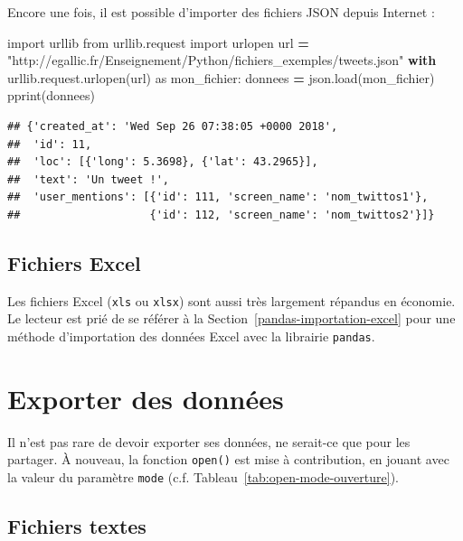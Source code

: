 \documentclass[
  12pt,
]{book}
\newenvironment{Shaded}{\begin{snugshade}}{\end{snugshade}}
\newcommand{\ControlFlowTok}[1]{\textcolor[rgb]{0.13,0.29,0.53}{\textbf{#1}}}
\newcommand{\ImportTok}[1]{#1}
\newcommand{\NormalTok}[1]{#1}
\newcommand{\OperatorTok}[1]{\textcolor[rgb]{0.81,0.36,0.00}{\textbf{#1}}}
\newcommand{\StringTok}[1]{\textcolor[rgb]{0.31,0.60,0.02}{#1}}
\numberwithin{equation}{section}
\numberwithin{countremarque}{section}
\begin{document}
Encore une fois, il est possible d'importer des fichiers JSON depuis Internet :

\begin{Shaded}
\begin{Highlighting}[]
\ImportTok{import}\NormalTok{ urllib}
\ImportTok{from}\NormalTok{ urllib.request }\ImportTok{import}\NormalTok{ urlopen}
\NormalTok{url }\OperatorTok{=} \StringTok{"http://egallic.fr/Enseignement/Python/fichiers\_exemples/tweets.json"}
\ControlFlowTok{with}\NormalTok{ urllib.request.urlopen(url) }\ImportTok{as}\NormalTok{ mon\_fichier:}
\NormalTok{   donnees }\OperatorTok{=}\NormalTok{ json.load(mon\_fichier)}
\NormalTok{pprint(donnees)}
\end{Highlighting}
\end{Shaded}

\begin{lstlisting}
## {'created_at': 'Wed Sep 26 07:38:05 +0000 2018',
##  'id': 11,
##  'loc': [{'long': 5.3698}, {'lat': 43.2965}],
##  'text': 'Un tweet !',
##  'user_mentions': [{'id': 111, 'screen_name': 'nom_twittos1'},
##                    {'id': 112, 'screen_name': 'nom_twittos2'}]}
\end{lstlisting}

\subsection{Fichiers Excel}\label{fichiers-excel}

Les fichiers Excel (\texttt{xls} ou \texttt{xlsx}) sont aussi très largement répandus en économie. Le lecteur est prié de se référer à la Section~\ref{pandas-importation-excel} pour une méthode d'importation des données Excel avec la librairie \texttt{pandas}.

\section{Exporter des données}\label{exporter-des-donnuxe9es}

Il n'est pas rare de devoir exporter ses données, ne serait-ce que pour les partager. À nouveau, la fonction \texttt{open()} est mise à contribution, en jouant avec la valeur du paramètre \texttt{mode} (c.f. Tableau~\ref{tab:open-mode-ouverture}).

\subsection{Fichiers textes}\label{fichiers-textes}
\end{document}
